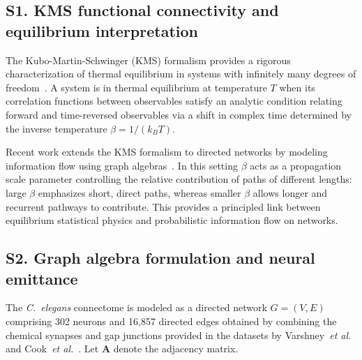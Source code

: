 \setcounter{equation}{0}
\setcounter{figure}{0}
\setcounter{table}{0}
\setcounter{section}{0}
\renewcommand{\theequation}{S\arabic{equation}}
\renewcommand{\thefigure}{S\arabic{figure}}
\renewcommand{\thetable}{S\arabic{table}}


\subsection*{S1.\; KMS functional connectivity and equilibrium interpretation}

The Kubo-Martin-Schwinger (KMS) formalism provides a rigorous characterization of
thermal equilibrium in systems with infinitely many degrees of
freedom~\cite{haag1967quantum}. A system is in thermal equilibrium at temperature $T$
when its correlation functions between observables satisfy an analytic condition relating
forward and time-reversed observables via a shift in complex time determined by the
inverse temperature $\beta = 1/(k_B T)$.

Recent work extends the KMS formalism to directed networks by modeling information flow
using graph algebras~\cite{raeburn2005graph, moutuou2025kubo, moutuou2025brain}. In this
setting $\beta$ acts as a propagation scale parameter controlling the relative
contribution of paths of different lengths: large $\beta$ emphasizes short, direct paths,
whereas smaller $\beta$ allows longer and recurrent pathways to contribute. This provides
a principled link between equilibrium statistical physics and probabilistic information
flow on networks.

\subsection*{S2.\; Graph algebra formulation and neural emittance}

The \emph{C.~elegans} connectome is modeled as a directed network $G=(V,E)$ comprising
302 neurons and 16,857 directed edges obtained by combining the chemical synapses and gap
junctions provided in the datasets by Varshney~\emph{et al.} and Cook~\emph{et
al.}~\cite{varshney2011structural, cook2019connectome}. Let $\mathbf{A}$ denote the
adjacency matrix.

